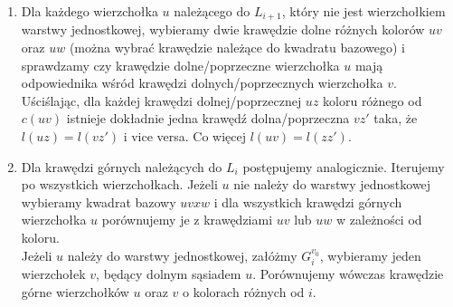 \documentclass[12pt,a4paper,titlepage]{article}
\begin{document}
\begin{enumerate}
\item
Dla każdego wierzchołka $u$ należącego do $L_{i+1}$, który nie jest wierzchołkiem warstwy jednostkowej, wybieramy dwie krawędzie dolne różnych kolorów $uv$ oraz $uw$ (można wybrać krawędzie należące do kwadratu bazowego) i sprawdzamy czy krawędzie dolne/poprzeczne wierzchołka $u$ mają odpowiednika wśród krawędzi dolnych/poprzecznych wierzchołka $v$. Uściślając, dla każdej krawędzi dolnej/poprzecznej $uz$ koloru różnego od $c(uv)$ istnieje dokładnie jedna krawędź dolna/poprzeczna $vz'$ taka, że $l(uz)=l(vz')$ i vice versa. Co więcej $l(uv)=l(zz')$.
\item
Dla krawędzi górnych należących do $L_i$ postępujemy analogicznie. Iterujemy po wszystkich wierzchołkach. Jeżeli $u$ nie należy do warstwy jednostkowej wybieramy kwadrat bazowy $uvxw$ i dla wszystkich krawędzi górnych wierzchołka $u$ porównujemy je z krawędziami $uv$ lub $uw$ w zależności od koloru.\\
Jeżeli $u$ należy do warstwy jednostkowej, załóżmy $G^{v_0}_i$, wybieramy jeden wierzchołek $v$, będący dolnym sąsiadem $u$. Porównujemy wówczas krawędzie górne wierzchołków $u$ oraz $v$ o kolorach różnych od $i$. 
\end{enumerate}
\end{document}
